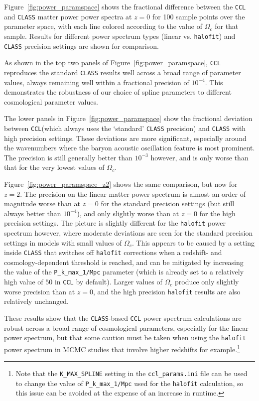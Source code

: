 \documentclass[\docopts]{\docclass}
\newcommand{\ccl}{{\tt CCL}\xspace}
\newcommand{\halofit}{{\tt halofit}\xspace}
\newcommand{\class}{{\tt CLASS}\xspace}
\begin{document}
Figure~\ref{fig:power_paramspace} shows the fractional difference between the \ccl and \class matter power power spectra at $z=0$ for 100 sample points over the parameter space, with each line colored according to the value of $\Omega_c$ for that sample. Results for different power spectrum types (linear vs. \halofit) and \class precision settings are shown for comparison.

As shown in the top two panels of Figure~\ref{fig:power_paramspace}, \ccl reproduces the standard \class results well across a broad range of parameter values, always remaining well within a fractional precision of $10^{-4}$. This demonstrates the robustness of our choice of spline parameters to different cosmological parameter values.

The lower panels in Figure~\ref{fig:power_paramspace} show the fractional deviation between \ccl (which always uses the `standard' \class precision) and \class with high precision settings. These deviations are more significant, especially around the wavenumbers where the baryon acoustic oscillation feature is most prominent. The precision is still generally better than $10^{-3}$ however, and is only worse than that for the very lowest values of $\Omega_c$.

Figure~\ref{fig:power_paramspace_z2} shows the same comparison, but now for $z=2$. The precision on the linear matter power spectrum is almost an order of magnitude worse than at $z=0$ for the standard precision settings (but still always better than $10^{-4}$), and only slightly worse than at $z=0$ for the high precision settings. The picture is slightly different for the \halofit power spectrum however, where moderate deviations are seen for the standard precision settings in models with small values of $\Omega_c$. This appears to be caused by a setting inside \class that switches off \halofit corrections when a redshift- and cosmology-dependent threshold is reached, and can be mitigated by increasing the value of the {\tt P\_k\_max\_1/Mpc} parameter (which is already set to a relatively high value of $50$ in \ccl by default). Larger values of $\Omega_c$ produce only slightly worse precision than at $z=0$, and the high precision \halofit results are also relatively unchanged.

These results show that the \class-based \ccl power spectrum calculations are robust across a broad range of cosmological parameters, especially for the linear power spectrum, but that some caution must be taken when using the \halofit power spectrum in MCMC studies that involve higher redshifts for example.\footnote{Note that the {\tt K\_MAX\_SPLINE} setting in the {\tt ccl\_params.ini} file can be used to change the value of {\tt P\_k\_max\_1/Mpc} used for the \halofit calculation, so this issue can be avoided at the expense of an increase in runtime.}
\end{document}

